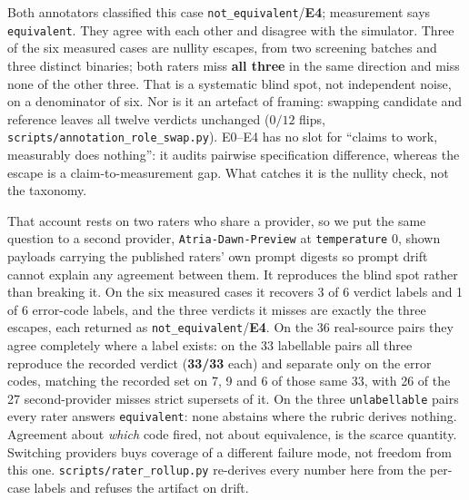 \documentclass[sigconf,anonymous,nonacm]{acmart}
\begin{document}
Both annotators classified this case \texttt{not\_equivalent}/\textbf{E4}; measurement says \texttt{equivalent}. They agree with each other and disagree with the simulator. Three of the six measured cases are nullity escapes, from two screening batches and three distinct binaries; both raters miss \textbf{all three} in the same direction and miss none of the other three. That is a systematic blind spot, not independent noise, on a denominator of six. Nor is it an artefact of framing: swapping candidate and reference leaves all twelve verdicts unchanged ($0/12$ flips, \texttt{scripts/annotation\_role\_swap.py}). E0--E4 has no slot for ``claims to work, measurably does nothing'': it audits pairwise specification difference, whereas the escape is a claim-to-measurement gap. What catches it is the nullity check, not the taxonomy.

That account rests on two raters who share a provider, so we put the same question to a second provider, \texttt{Atria-Dawn-Preview} at \texttt{temperature} 0, shown payloads carrying the published raters' own prompt digests so prompt drift cannot explain any agreement between them. It reproduces the blind spot rather than breaking it. On the six measured cases it recovers 3 of 6 verdict labels and 1 of 6 error-code labels, and the three verdicts it misses are exactly the three escapes, each returned as \texttt{not\_equivalent}/\textbf{E4}. On the 36 real-source pairs they agree completely where a label exists: on the 33 labellable pairs all three reproduce the recorded verdict (\textbf{33/33} each) and separate only on the error codes, matching the recorded set on 7, 9 and 6 of those same 33, with 26 of the 27 second-provider misses strict supersets of it. On the three \texttt{unlabellable} pairs every rater answers \texttt{equivalent}: none abstains where the rubric derives nothing. Agreement about \emph{which} code fired, not about equivalence, is the scarce quantity. Switching providers buys coverage of a different failure mode, not freedom from this one. \texttt{scripts/rater\_rollup.py} re-derives every number here from the per-case labels and refuses the artifact on drift.
\end{document}
